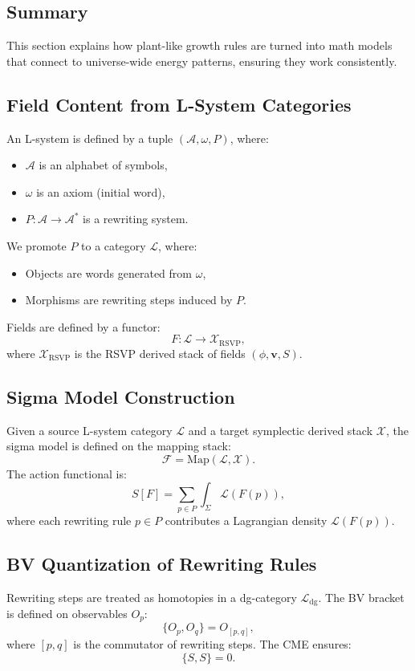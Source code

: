 \documentclass[11pt,oneside]{memoir}
\theoremstyle{plain}
\newcommand{\F}{\mathcal{F}}
\newcommand{\X}{\mathcal{X}}
\newcommand{\A}{\mathcal{A}}
\newcommand{\Lcal}{\mathcal{L}} %
\begin{document}
\subsection{Summary}
This section explains how plant-like growth rules are turned into math models that connect to universe-wide energy patterns, ensuring they work consistently.

\subsection{Field Content from L-System Categories}
An L-system is defined by a tuple \((\A, \omega, P)\), where:
\begin{itemize}
    \item \(\A\) is an alphabet of symbols,
    \item \(\omega\) is an axiom (initial word),
    \item \(P: \A \to \A^*\) is a rewriting system.
\end{itemize}
We promote \(P\) to a category \(\Lcal\), where:
\begin{itemize}
    \item Objects are words generated from \(\omega\),
    \item Morphisms are rewriting steps induced by \(P\).
\end{itemize}
Fields are defined by a functor:
\begin{equation}
    F : \Lcal \longrightarrow \X_{\mathrm{RSVP}},
\end{equation}
where \(\X_{\mathrm{RSVP}}\) is the RSVP derived stack of fields \((\phi, \mathbf{v}, S)\).

\subsection{Sigma Model Construction}
Given a source L-system category \(\Lcal\) and a target symplectic derived stack \(\X\), the sigma model is defined on the mapping stack:
\begin{equation}
    \F = \mathrm{Map}(\Lcal, \X).
\end{equation}
The action functional is:
\begin{equation}
    S[F] = \sum_{p \in P} \int_\Sigma \mathcal{L}(F(p)),
\end{equation}
where each rewriting rule \(p \in P\) contributes a Lagrangian density \(\mathcal{L}(F(p))\).

\subsection{BV Quantization of Rewriting Rules}
Rewriting steps are treated as homotopies in a dg-category \(\Lcal_{\mathrm{dg}}\). The BV bracket is defined on observables \(O_p\):
\begin{equation}
    \{O_p, O_q\} = O_{[p,q]},
\end{equation}
where \([p,q]\) is the commutator of rewriting steps. The CME ensures:
\begin{equation}
    \{ S, S \} = 0.
\end{equation}
\end{document}
